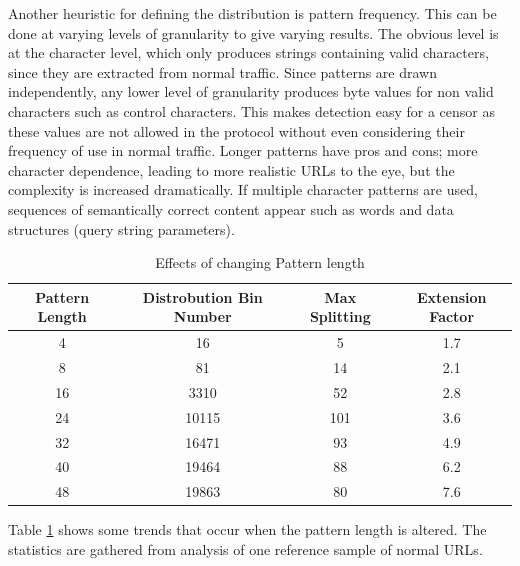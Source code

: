 \documentclass[10pt,a4paper]{article}
\begin{document}
Another heuristic for defining the distribution is pattern frequency. This can be done at varying levels of granularity to give varying results. The obvious level is at the character level, which only produces strings containing valid characters, since they are extracted from normal traffic. Since patterns are drawn independently, any lower level of granularity produces byte values for non valid characters such as control characters. This makes detection easy for a censor as these values are not allowed in the protocol without even considering their frequency of use in normal traffic. Longer patterns have pros and cons; more character dependence, leading to more realistic URLs to the eye, but the complexity is increased dramatically. If multiple character patterns are used, sequences of semantically correct content appear such as words and data structures (query string parameters). 

\begin{table}[h]
\centering
\begin{tabular}{|c|c|c|c|}
\hline
Pattern Length&
Distrobution Bin Number&
Max Splitting&
Extension Factor\\
\hline
4&16&5&1.7\\
8&81&14&2.1\\
16&3310&52&2.8\\
24&10115&101&3.6\\
32&16471&93&4.9\\
40&19464&88&6.2\\
48&19863&80&7.6\\
\hline
\end{tabular}
\caption{Effects of changing Pattern length}
\label{tab:patlen}
\end{table}

Table \ref{tab:patlen} shows some trends that occur when the pattern length is altered. The statistics are gathered from analysis of one reference sample of normal URLs.
\end{document}

